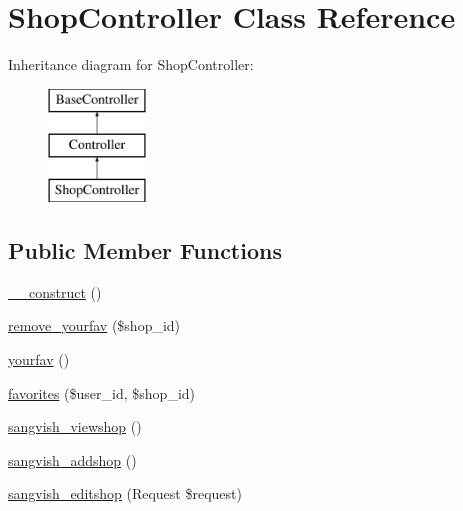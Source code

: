 \hypertarget{class_responsive_1_1_http_1_1_controllers_1_1_shop_controller}{}\section{Shop\+Controller Class Reference}
\label{class_responsive_1_1_http_1_1_controllers_1_1_shop_controller}
Inheritance diagram for Shop\+Controller\+:\begin{figure}[H]
\begin{center}
\leavevmode
\includegraphics[height=3.000000cm]{class_responsive_1_1_http_1_1_controllers_1_1_shop_controller}
\end{center}
\end{figure}
\subsection*{Public Member Functions}
\begin{DoxyCompactItemize}
\item 
\mbox{\hyperlink{class_responsive_1_1_http_1_1_controllers_1_1_shop_controller_a095c5d389db211932136b53f25f39685}{\+\_\+\+\_\+construct}} ()
\item 
\mbox{\hyperlink{class_responsive_1_1_http_1_1_controllers_1_1_shop_controller_a45b2fa0db65f3c00da989802f17399fc}{remove\+\_\+yourfav}} (\$shop\+\_\+id)
\item 
\mbox{\hyperlink{class_responsive_1_1_http_1_1_controllers_1_1_shop_controller_a6fd757daf4769781192232c9615a4201}{yourfav}} ()
\item 
\mbox{\hyperlink{class_responsive_1_1_http_1_1_controllers_1_1_shop_controller_af6941ecb27762273fef0e0a507c0e5f8}{favorites}} (\$user\+\_\+id, \$shop\+\_\+id)
\item 
\mbox{\hyperlink{class_responsive_1_1_http_1_1_controllers_1_1_shop_controller_af27a6de05f3ac755be3346d89b118a84}{sangvish\+\_\+viewshop}} ()
\item 
\mbox{\hyperlink{class_responsive_1_1_http_1_1_controllers_1_1_shop_controller_a94ca394576518bac9378129d4e6698ce}{sangvish\+\_\+addshop}} ()
\item 
\mbox{\hyperlink{class_responsive_1_1_http_1_1_controllers_1_1_shop_controller_a91ccb31ea3618b9969dcd4bca9108803}{sangvish\+\_\+editshop}} (Request \$request)
\end{DoxyCompactItemize}
